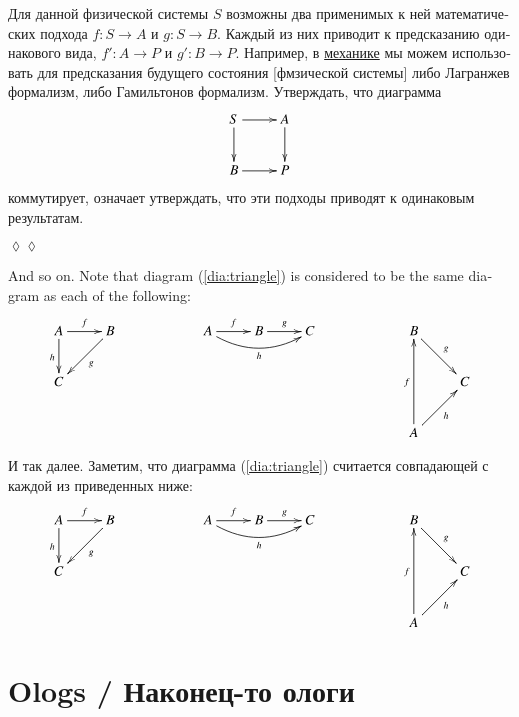 \documentclass[a4paper]{book}
\def\to{\rightarrow}
\def\taking{\colon}
\theoremstyle{myth}
\newtheorem{appRUS}[envRUS]{\begin{russian}Прикладной пример (применение)\end{russian}}
\newenvironment{applicationRUS}{\begin{appRUS}}{\hspace*{\fill}$\lozenge\lozenge$\end{appRUS}}
\begin{document}
\begin{english}
\begin{applicationRUS}
\begin{russian} 
Для данной физической системы $S$ возможны два применимых к ней математических подхода $f\taking S\to A$ и $g\taking S\to B$. Каждый из них приводит к предсказанию одинакового вида, $f'\taking A\to P$ и $g'\taking B\to P$. Например, в \href{https://ru.wikipedia.org/wiki/%D0%93%D0%B0%D0%BC%D0%B8%D0%BB%D1%8C%D1%82%D0%BE%D0%BD%D0%BE%D0%B2%D0%B0_%D0%BC%D0%B5%D1%85%D0%B0%D0%BD%D0%B8%D0%BA%D0%B0#.D0.9F.D0.B5.D1.80.D0.B5.D1.84.D0.BE.D1.80.D0.BC.D1.83.D0.BB.D0.B8.D1.80.D0.BE.D0.B2.D0.BA.D0.B0_.D0.BB.D0.B0.D0.B3.D1.80.D0.B0.D0.BD.D0.B6.D0.B5.D0.B2.D0.BE.D0.B9_.D0.BC.D0.B5.D1.85.D0.B0.D0.BD.D0.B8.D0.BA.D0.B8}{\text механике} мы можем использовать для предсказания будущего состояния [фмзической системы] либо Лагранжев формализм, либо Гамильтонов формализм. Утверждать, что диаграмма 
$$
\xymatrix{S\ar[r]\ar[d]&A\ar[d]\\B\ar[r]&P}
$$
коммутирует, означает утверждать, что эти подходы приводят к одинаковым результатам.
\end{russian}
\end{applicationRUS}

And so on. Note that diagram (\ref{dia:triangle}) is considered to be the same diagram as each of the following:
$$
\xymatrix{A\ar[r]^f\ar[d]_h&B\ar[dl]^g\\C}\hspace{.8in}
\xymatrix{A\ar[r]^f\ar@/_1pc/[rr]_h&B\ar[r]^g&C}\hspace{.8in}
\xymatrix{B\ar[rd]^g\\&C\\A\ar[ru]_h\ar[uu]^f}$$

\begin{russian} 
И так далее. Заметим, что диаграмма (\ref{dia:triangle}) считается совпадающей с каждой из приведенных ниже:
$$
\xymatrix{A\ar[r]^f\ar[d]_h&B\ar[dl]^g\\C}\hspace{.8in}
\xymatrix{A\ar[r]^f\ar@/_1pc/[rr]_h&B\ar[r]^g&C}\hspace{.8in}
\xymatrix{B\ar[rd]^g\\&C\\A\ar[ru]_h\ar[uu]^f}$$
\end{russian}




\section{Ologs / Наконец-то ологи}\label{sec:ologs}


\end{english}
\end{document}
